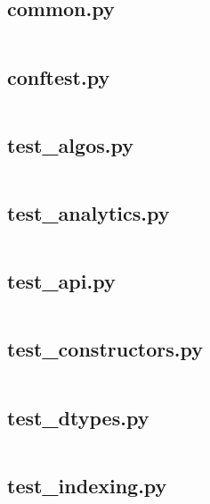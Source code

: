 \documentclass{article}
\begin{document}
\subsection{common.py}
\inputminted{python}{/home/dufferzafar/dev/@clones/pandas/pandas/tests/categorical/common.py}
\newpage

\subsection{conftest.py}
\inputminted{python}{/home/dufferzafar/dev/@clones/pandas/pandas/tests/categorical/conftest.py}
\newpage

\subsection{test\_algos.py}
\inputminted{python}{/home/dufferzafar/dev/@clones/pandas/pandas/tests/categorical/test_algos.py}
\newpage

\subsection{test\_analytics.py}
\inputminted{python}{/home/dufferzafar/dev/@clones/pandas/pandas/tests/categorical/test_analytics.py}
\newpage

\subsection{test\_api.py}
\inputminted{python}{/home/dufferzafar/dev/@clones/pandas/pandas/tests/categorical/test_api.py}
\newpage

\subsection{test\_constructors.py}
\inputminted{python}{/home/dufferzafar/dev/@clones/pandas/pandas/tests/categorical/test_constructors.py}
\newpage

\subsection{test\_dtypes.py}
\inputminted{python}{/home/dufferzafar/dev/@clones/pandas/pandas/tests/categorical/test_dtypes.py}
\newpage

\subsection{test\_indexing.py}
\inputminted{python}{/home/dufferzafar/dev/@clones/pandas/pandas/tests/categorical/test_indexing.py}
\newpage
\end{document}
